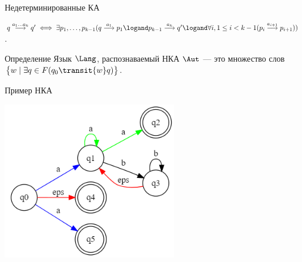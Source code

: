 \begin{frame}{Недетерминированные КА}
{\begin{wideitemize}
            \item $q \overset{a_1\dots a_k}{\longrightarrow} q'\iff \exists p_1,\dots,p_{k-1}(q\overset{a_1}{\longrightarrow}p_1\logand p_{k-1}\overset{a_k}{\longrightarrow}q'\logand \forall i,1\leq i<k-1(p_i\overset{a_{i+1}}{\longrightarrow}p_{i+1}))$.
        \end{wideitemize}

        \vspace{-5pt}
        \begin{block}{Определение}
            Язык $\Lang$, распознаваемый НКА $\Aut$ --- это множество слов $\bigl\lbrace{}w\mid\exists q\in F (q_0\transit{w}q)\bigr\rbrace{}$.
        \end{block}
    }
\end{frame} %

\begin{frame}{Пример НКА}
    \vspace{-5pt}
    \begin{center}
        \includegraphics[width=3in, keepaspectratio]{tompson1.png} %
    \end{center}
\end{frame}%


